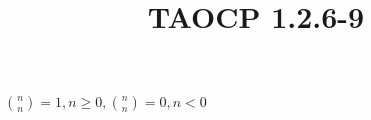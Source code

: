 \documentclass{article}
\title{TAOCP 1.2.6\mbox{-}9}
\begin{document}
\maketitle

\( \binom{n}{n} = 1, n \geq 0, \binom{n}{n} = 0, n < 0 \)
\end{document}
